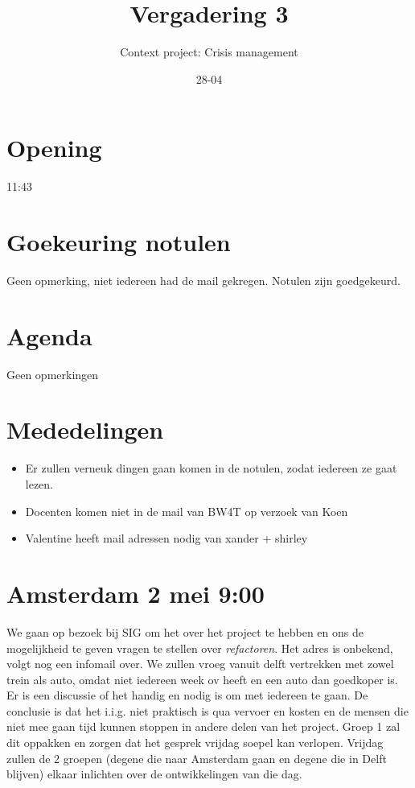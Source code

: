 \documentclass{article}
\begin{document}
\title{Vergadering 3}
\author{Context project: Crisis management}
\date{28-04}
\maketitle 

\section{Opening} 
11:43
\section{Goekeuring notulen}
Geen opmerking, niet iedereen had de mail gekregen. Notulen zijn goedgekeurd. 
\section{Agenda} 
Geen opmerkingen 
\section{Mededelingen} 
\begin{itemize}
\item Er zullen verneuk dingen gaan komen in de notulen, zodat iedereen ze gaat lezen. 
\item Docenten komen niet in de mail van BW4T op verzoek van Koen
\item Valentine heeft mail adressen nodig van xander + shirley
\end{itemize}
\section{Amsterdam 2 mei 9:00} 
We gaan op bezoek bij SIG om het over het project te hebben en ons de mogelijkheid te geven vragen te stellen over \emph{refactoren}. Het adres is onbekend, volgt nog een infomail over. We zullen vroeg vanuit delft vertrekken met zowel trein als auto, omdat niet iedereen week ov heeft en een auto dan goedkoper is. Er is een discussie of het handig en nodig is om met iedereen te gaan. De conclusie is dat het i.i.g. niet praktisch is qua vervoer en kosten en de mensen die niet mee gaan tijd kunnen stoppen in andere delen van het project. Groep 1 zal dit oppakken en zorgen dat het gesprek vrijdag soepel kan verlopen. Vrijdag zullen de 2 groepen (degene die naar Amsterdam gaan en degene die in Delft blijven) elkaar inlichten over de ontwikkelingen van die dag.\linebreak
\end{document}
